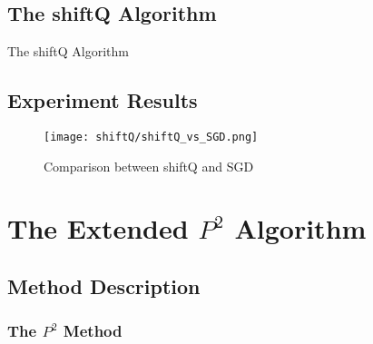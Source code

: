\subsection{The shiftQ Algorithm}
\begin{algorithm}
    \caption{The shiftQ Algorithm}\label{alg:multi_shiftQ}
        \begin{algorithmic}[1]
        \end{algorithmic}
\end{algorithm}
\subsection{Experiment Results}

\begin{figure*}[h!]
	\texttt{[image: shiftQ/shiftQ\_vs\_SGD.png]}
	\caption{Comparison between shiftQ and SGD}
\end{figure*}

\fi


\section{The Extended $P^2$ Algorithm}
\label{sec: multi_{p2}}

\subsection{Method Description}

\subsubsection{The $P^2$ Method}
